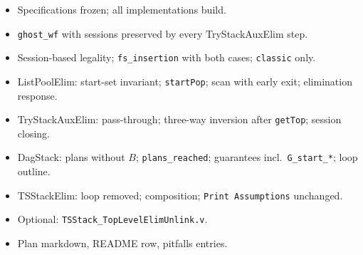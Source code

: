 \documentclass[11pt]{article}
\theoremstyle{definition}
\theoremstyle{remark}
\newcommand{\code}[1]{\texttt{#1}}
\newcommand{\file}[1]{\texttt{#1}}
\begin{document}
\begin{itemize}[nosep]
\item[$\square$] Specifications frozen; all implementations build.
\item[$\square$] \code{ghost\_wf} with sessions preserved by every TryStackAuxElim step.
\item[$\square$] Session-based legality; \code{fs\_insertion} with both cases; \code{classic} only.
\item[$\square$] ListPoolElim: start-set invariant; \code{startPop}; scan with early exit; elimination response.
\item[$\square$] TryStackAuxElim: pass-through; three-way inversion after \code{getTop}; session closing.
\item[$\square$] DagStack: plans without $B$; \code{plans\_reached}; guarantees incl.\ \code{G\_start\_*}; loop outline.
\item[$\square$] TSStackElim: loop removed; composition; \code{Print Assumptions} unchanged.
\item[$\square$] Optional: \file{TSStack\_TopLevelElimUnlink.v}.
\item[$\square$] Plan markdown, README row, pitfalls entries.
\end{itemize}
\end{document}

